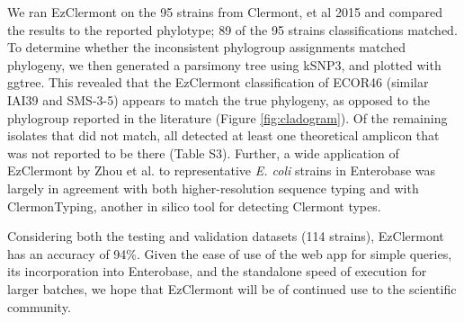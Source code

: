 

We ran EzClermont on the 95 strains from Clermont, et al 2015 and compared the results to the reported phylotype; 89 of the 95 strains classifications matched.  To determine whether the inconsistent phylogroup assignments matched phylogeny, we then generated a parsimony tree using kSNP3\cite{Gardner2015a}, and plotted with ggtree\cite{Yu2017a}. This revealed that the EzClermont classification of ECOR46 (similar IAI39 and SMS-3-5) appears to match the true phylogeny, as opposed to the phylogroup reported in the literature (Figure \ref{fig:cladogram}).  Of the remaining isolates that did not match, all detected at least one theoretical amplicon that was not reported to be there (Table S3). Further, a wide application of EzClermont by Zhou et al.\cite{zhou_users_2019} to representative \textit{E. coli}  strains in Enterobase was largely in agreement with both higher-resolution sequence typing and with ClermonTyping\cite{beghain_clermontyping:_2018}, another in silico tool for detecting Clermont types.





Considering both the testing and validation datasets (114 strains), EzClermont has an accuracy of 94\%. Given the ease of use of the web app for simple queries, its incorporation into Enterobase, and the standalone speed of execution for larger batches, we hope that EzClermont will be of continued use to the scientific community.
